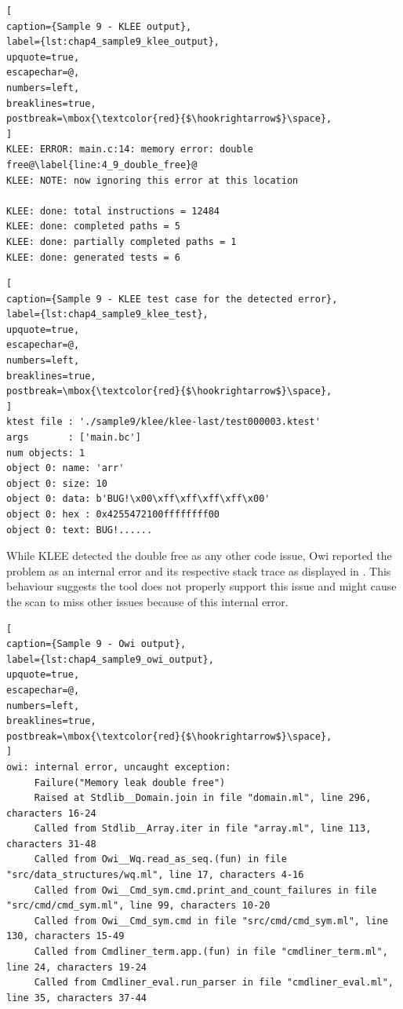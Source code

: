 \begin{lstlisting}[
caption={Sample 9 - KLEE output},
label={lst:chap4_sample9_klee_output},
upquote=true,
escapechar=@,
numbers=left,
breaklines=true,
postbreak=\mbox{\textcolor{red}{$\hookrightarrow$}\space},
]
KLEE: ERROR: main.c:14: memory error: double free@\label{line:4_9_double_free}@
KLEE: NOTE: now ignoring this error at this location

KLEE: done: total instructions = 12484
KLEE: done: completed paths = 5
KLEE: done: partially completed paths = 1
KLEE: done: generated tests = 6
\end{lstlisting}

\begin{lstlisting}[
caption={Sample 9 - KLEE test case for the detected error},
label={lst:chap4_sample9_klee_test},
upquote=true,
escapechar=@,
numbers=left,
breaklines=true,
postbreak=\mbox{\textcolor{red}{$\hookrightarrow$}\space},
]
ktest file : './sample9/klee/klee-last/test000003.ktest'
args       : ['main.bc']
num objects: 1
object 0: name: 'arr'
object 0: size: 10
object 0: data: b'BUG!\x00\xff\xff\xff\xff\x00'
object 0: hex : 0x4255472100ffffffff00
object 0: text: BUG!......
\end{lstlisting}

While KLEE detected the double free as any other code issue, Owi reported the problem as an internal error and its respective stack trace as displayed in . This behaviour suggests the tool does not properly support this issue and might cause the scan to miss other issues because of this internal error.

\begin{lstlisting}[
caption={Sample 9 - Owi output},
label={lst:chap4_sample9_owi_output},
upquote=true,
escapechar=@,
numbers=left,
breaklines=true,
postbreak=\mbox{\textcolor{red}{$\hookrightarrow$}\space},
]
owi: internal error, uncaught exception:
     Failure("Memory leak double free")
     Raised at Stdlib__Domain.join in file "domain.ml", line 296, characters 16-24
     Called from Stdlib__Array.iter in file "array.ml", line 113, characters 31-48
     Called from Owi__Wq.read_as_seq.(fun) in file "src/data_structures/wq.ml", line 17, characters 4-16
     Called from Owi__Cmd_sym.cmd.print_and_count_failures in file "src/cmd/cmd_sym.ml", line 99, characters 10-20
     Called from Owi__Cmd_sym.cmd in file "src/cmd/cmd_sym.ml", line 130, characters 15-49
     Called from Cmdliner_term.app.(fun) in file "cmdliner_term.ml", line 24, characters 19-24
     Called from Cmdliner_eval.run_parser in file "cmdliner_eval.ml", line 35, characters 37-44
\end{lstlisting}


